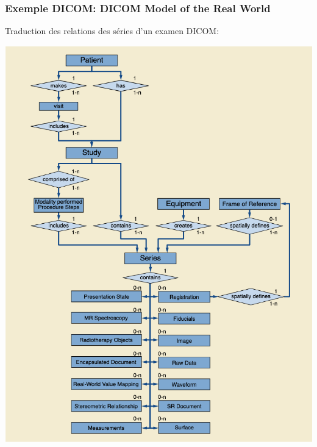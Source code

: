 	\frame
	{
		\frametitle{Exemple DICOM: DICOM Model of the Real World}
		Traduction des relations des s\'eries d'un examen DICOM:
		\begin{center}
			\includegraphics[scale=0.20]{../figures/PS3.png}
		\end{center}
	}

